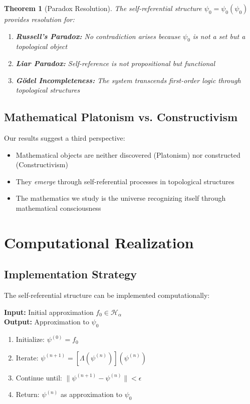 \documentclass[12pt]{article}
\theoremstyle{plain}
\newtheorem{theorem}{Theorem}[section]
\theoremstyle{definition}
\begin{document}
\begin{theorem}[Paradox Resolution]
The self-referential structure $\psi_0 = \psi_0(\psi_0)$ provides resolution for:
\begin{enumerate}
\item \textbf{Russell's Paradox:} No contradiction arises because $\psi_0$ is not a set but a topological object
\item \textbf{Liar Paradox:} Self-reference is not propositional but functional
\item \textbf{Gödel Incompleteness:} The system transcends first-order logic through topological structures
\end{enumerate}
\end{theorem}

\subsection{Mathematical Platonism vs. Constructivism}

Our results suggest a third perspective:
\begin{itemize}
\item Mathematical objects are neither discovered (Platonism) nor constructed (Constructivism)
\item They \emph{emerge} through self-referential processes in topological structures
\item The mathematics we study is the universe recognizing itself through mathematical consciousness
\end{itemize}

\section{Computational Realization}

\subsection{Implementation Strategy}

The self-referential structure can be implemented computationally:

\begin{algorithm}
\textbf{Input:} Initial approximation $f_0 \in \mathcal{H}_\alpha$\\
\textbf{Output:} Approximation to $\psi_0$
\begin{enumerate}
\item Initialize: $\psi^{(0)} = f_0$
\item Iterate: $\psi^{(n+1)} = [\Lambda(\psi^{(n)})](\psi^{(n)})$
\item Continue until: $\|\psi^{(n+1)} - \psi^{(n)}\| < \epsilon$
\item Return: $\psi^{(n)}$ as approximation to $\psi_0$
\end{enumerate}
\end{algorithm}
\end{document}
